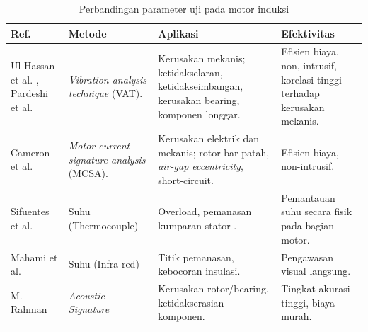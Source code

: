 \documentclass{elsinta}
\begin{document}
\begin{table}[t!]
\centering
\caption{Perbandingan parameter uji pada motor induksi}
\begin{tabular}{|p{2cm}|p{3cm}|p{4cm}|p{4cm}|}
\hline
\textbf{Ref.} & \textbf{Metode} & \textbf{Aplikasi} & \textbf{Efektivitas}\\ \hline

Ul Hassan et al. \cite{1.1.13}, Pardeshi et al. \cite{1.2.1} 
& \textit{Vibration analysis technique} (VAT).
& Kerusakan mekanis; ketidakselaran, ketidakseimbangan, kerusakan bearing,  komponen longgar.
& Efisien biaya, non, intrusif, korelasi tinggi terhadap kerusakan mekanis.\\ \hline

Cameron et al. \cite{1.1.15}
& \textit{Motor current signature analysis} (MCSA).
& Kerusakan elektrik dan mekanis; rotor bar patah, \textit{air-gap eccentricity}, short-circuit.
& Efisien biaya, non-intrusif.\\ \hline

Sifuentes et al. \cite{1.1.12}
& Suhu (Thermocouple)
& Overload, pemanasan kumparan stator .
& Pemantauan suhu secara fisik pada bagian motor.\\ \hline

Mahami et al. \cite{1.2.2}
& Suhu (Infra-red)
& Titik pemanasan, kebocoran insulasi.
& Pengawasan visual langsung.\\ \hline

M. Rahman \cite{1.1.16}
& \textit{Acoustic Signature}
& Kerusakan rotor/bearing, ketidakserasian komponen.
& Tingkat akurasi tinggi, biaya murah.\\ \hline

\end{tabular}
\end{table}


\end{document}
